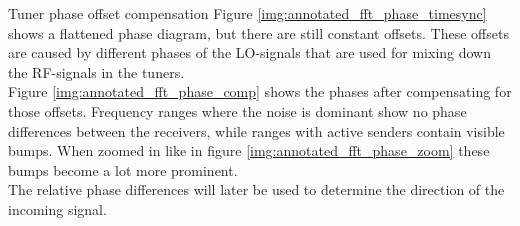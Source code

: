 \begin{subchapter}{Tuner phase offset compensation}
  Figure \ref{img:annotated_fft_phase_timesync} shows a flattened
  phase diagram, but there are still constant offsets.
  These offsets are caused by different phases of the LO-signals
  that are used for mixing down the RF-signals in the tuners. \\

  Figure \ref{img:annotated_fft_phase_comp} shows the phases
  after compensating for those offsets. Frequency ranges where
  the noise is dominant show no phase differences between
  the receivers, while ranges with active senders contain
  visible bumps. When zoomed in like in figure \ref{img:annotated_fft_phase_zoom}
  these bumps become a lot more prominent. \\

  The relative phase differences will later be used to
  determine the direction of the incoming signal.
\end{subchapter}
